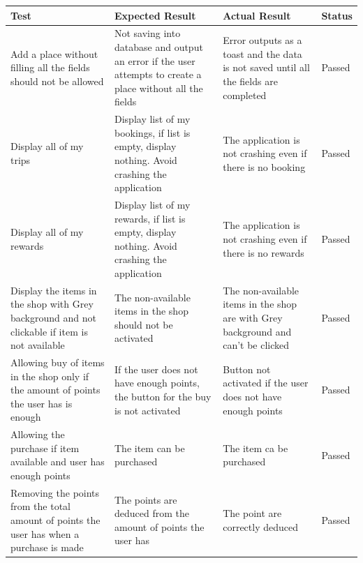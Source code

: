 \documentclass[paper=a4, fontsize=12pt,DIV=14]{scrartcl}    %
\begin{document}
			\begin{tabular}{|p{4.3cm}|p{4.3cm}|p{4.3cm}|p{2cm}|}
	            \hline
                \textbf{Test}& \textbf{Expected Result} & \textbf{Actual Result} & \textbf{Status} \\
                \hline
                \hline
                Add a place without filling all the fields should not be allowed
                & Not saving into database and output an error if the user attempts to create a place without all the fields 
                & Error outputs as a toast and the data is not saved until all the fields are completed
                & Passed\\
                \hline
                Display all of my trips
                & Display list of my bookings, if list is empty, display nothing. Avoid crashing the application
                & The application is not crashing even if there is no booking
                & Passed\\
                \hline
                Display all of my rewards
                & Display list of my rewards, if list is empty, display nothing. Avoid crashing the application
                & The application is not crashing even if there is no rewards
                & Passed\\
                \hline
                Display the items in the shop with Grey background and not clickable if item is not available
                & The non-available items in the shop should not be activated
                & The non-available items in the shop are with Grey background and can't be clicked
                & Passed\\
                \hline
                Allowing buy of items in the shop only if the amount of points the user has is enough
                & If the user does not have enough points, the button for the buy is not activated
                & Button not activated if the user does not have enough points
                & Passed\\
                \hline
                Allowing the purchase if item available and user has enough points
                & The item can be purchased
                & The item ca be purchased
                & Passed\\
                \hline
                Removing the points from the total amount of points the user has when a purchase is made
                & The points are deduced from the amount of points the user has
                & The point are correctly deduced
                & Passed\\

\end{tabular}
\end{document}

